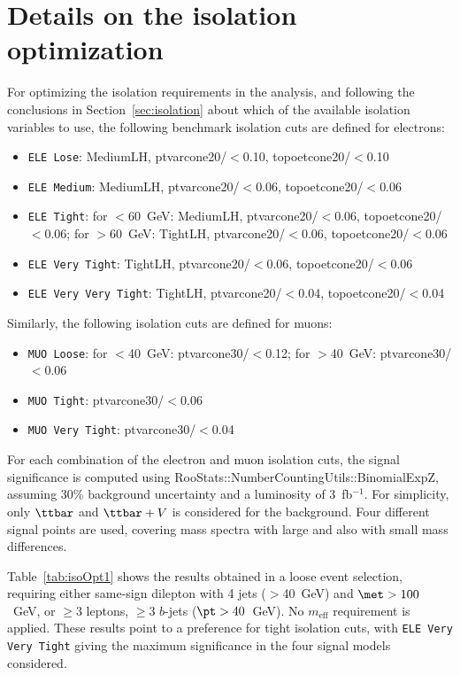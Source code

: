 \clearpage 
\section{Details on the isolation optimization}
\label{app_isolation}

For optimizing the isolation requirements in the analysis, and following the conclusions in Section~\ref{sec:isolation} 
about which of the available isolation variables to use, the following benchmark isolation cuts are defined for electrons:
\begin{itemize}
\item {\tt ELE Lose}: MediumLH, ptvarcone20/\pt$<$0.10, topoetcone20/\pt$<$0.10
\item {\tt ELE Medium}: MediumLH, ptvarcone20/\pt$<$0.06, topoetcone20/\pt$<$0.06
\item {\tt ELE Tight}: for \pt$<$60~GeV: MediumLH, ptvarcone20/\pt$<$0.06, topoetcone20/\pt$<$0.06;
           for \pt$>$60~GeV: TightLH, ptvarcone20/\pt$<$0.06, topoetcone20/\pt$<$0.06
\item {\tt ELE Very Tight}: TightLH, ptvarcone20/\pt$<$0.06, topoetcone20/\pt$<$0.06
\item {\tt ELE Very Very Tight}: TightLH, ptvarcone20/\pt$<$0.04, topoetcone20/\pt$<$0.04
\end{itemize}

Similarly, the following isolation cuts are defined for muons:
\begin{itemize}
\item {\tt MUO Loose}: for \pt$<$40~GeV: ptvarcone30/\pt$<$0.12; for \pt$>$40~GeV: ptvarcone30/\pt$<$0.06 
\item {\tt MUO Tight}: ptvarcone30/\pt$<$0.06 
\item {\tt MUO Very Tight}: ptvarcone30/\pt$<$0.04 
\end{itemize}

For each combination of the electron and muon isolation cuts, the signal significance is computed using RooStats::NumberCountingUtils::BinomialExpZ, assuming 30\% background uncertainty and a luminosity of 3~fb$^{-1}$. 
For simplicity, only $\ttbar$ and $\ttbar +V$ is considered for the background. Four different signal points are used, 
covering mass spectra with large and also with small mass differences.

Table~\ref{tab:isoOpt1} shows the results obtained in a loose event selection, requiring either same-sign dilepton with 4 jets (\pt$>$40~GeV) and $\met>100$~GeV, or $\geq$3 leptons, $\geq$3 $b$-jets ($\pt>40$~GeV). No $m_{\text{eff}}$ requirement is applied. 
These results point to a preference for tight isolation cuts, with {\tt ELE Very Very Tight} giving the maximum significance 
in the four signal models considered. 

